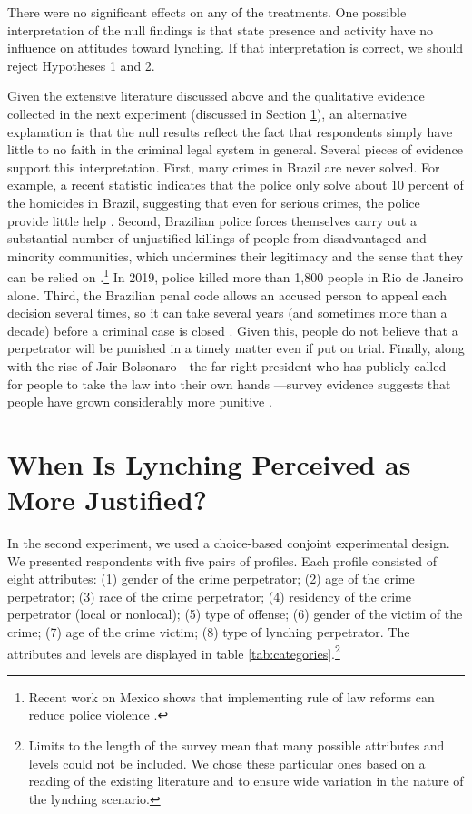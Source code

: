 \documentclass[12pt,ansiapaper]{article}
\begin{document}
There were no significant effects on any of the treatments. One possible interpretation of the null findings is that state presence and activity have no influence on attitudes toward lynching. If that interpretation is correct, we should reject Hypotheses 1 and 2. 

Given the extensive literature discussed above and the qualitative evidence collected in the next experiment (discussed in Section \ref{sec:exp01}), an alternative explanation is that the null results reflect the fact that respondents simply have little to no faith in the criminal legal system in general. Several pieces of evidence support this interpretation. First, many crimes in Brazil are never solved. For example, a recent statistic indicates that the police only solve about 10 percent of the homicides in Brazil, suggesting that even for serious crimes, the police provide little help \citep{pearson2018latam}. Second, Brazilian police forces themselves carry out a substantial number of unjustified killings of people from disadvantaged and minority communities, which undermines their legitimacy and the sense that they can be relied on \citep{willis2015killing}.\footnote{Recent work on Mexico shows that implementing rule of law reforms can reduce police violence \citep{magaloni2020institutionalized}.} In 2019, police killed more than 1,800 people in Rio de Janeiro alone. Third, the Brazilian penal code allows an accused person to appeal each decision several times, so it can take several years (and sometimes more than a decade) before a criminal case is closed \citep{sousa2005utilizaccao}. Given this, people do not believe that a perpetrator will be punished in a timely matter even if put on trial. Finally, along with the rise of Jair Bolsonaro---the far-right president who has publicly called for people to take the law into their own hands \citep{brant2021armas, uol2021bolsonaro}---survey evidence suggests that people have grown considerably more punitive \citep{datafolha2018penademorte}.

\section{When Is Lynching Perceived as More Justified?}
\label{sec:exp01}

In the second experiment, we used a choice-based conjoint experimental design. We presented respondents with five pairs of profiles. Each profile consisted of eight attributes: (1) gender of the crime perpetrator; (2) age of the crime perpetrator; (3) race of the crime perpetrator; (4) residency of the crime perpetrator (local or nonlocal); (5) type of offense; (6) gender of the victim of the crime; (7) age of the crime victim; (8) type of lynching perpetrator. The attributes and levels are displayed in table \ref{tab:categories}.\footnote{Limits to the length of the survey mean that many possible attributes and levels could not be included. We chose these particular ones based on a reading of the existing literature and to ensure wide variation in the nature of the lynching scenario.} 
\end{document}

